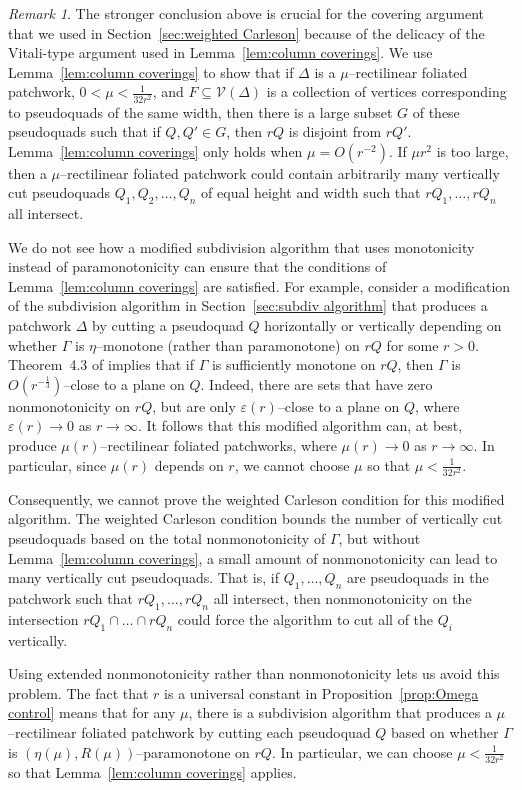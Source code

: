\documentclass[11pt,reqno]{amsart}
\newcommand{\cV}{\mathcal{V}}
\renewcommand{\epsilon}{\varepsilon}
\newcommand{\0}{\mathbf{0}}
\renewcommand{\1}{\mathbf 1}
\renewcommand{\subset}{\subseteq}
\theoremstyle{remark}
\newtheorem{remark}[thm]{Remark}
\begin{document}
\begin{remark}\label{rem:stronger-conclusion}
  The stronger conclusion above is crucial for the covering argument that we used in Section~\ref{sec:weighted Carleson} because of the delicacy of the Vitali-type argument used in Lemma~\ref{lem:column coverings}. We use Lemma~\ref{lem:column coverings} to show that if $\Delta$ is a $\mu$--rectilinear foliated patchwork, $0<\mu<\frac{1}{32r^2}$, and $F\subset \cV(\Delta)$ is a collection of vertices corresponding to pseudoquads of the same width, then there is a large subset $G$ of these pseudoquads such that if $Q,Q'\in G$, then $r Q$ is disjoint from $r Q'$. Lemma~\ref{lem:column coverings} only holds when $\mu=O(r^{-2})$.  If $\mu r^2$ is too large, then a $\mu$--rectilinear foliated patchwork could contain arbitrarily many vertically cut pseudoquads $Q_1,Q_2,\dots,Q_n$ of equal height and width such that $rQ_1,\dots, rQ_n$ all intersect.

  We do not see how a modified subdivision algorithm that uses monotonicity instead of paramonotonicity can ensure that the conditions of Lemma~\ref{lem:column coverings} are satisfied. For example, consider a modification of the subdivision algorithm in Section~\ref{sec:subdiv algorithm} that produces a patchwork $\Delta$ by cutting a pseudoquad $Q$ horizontally or vertically depending on whether $\Gamma$ is $\eta$--monotone (rather than paramonotone) on $rQ$ for some $r>0$. Theorem~4.3 of \cite{CKN} implies that if $\Gamma$ is sufficiently monotone on $rQ$, then $\Gamma$ is $O(r^{-\frac{1}{3}})$--close to a plane on $Q$. Indeed, there are sets that have zero nonmonotonicity on $rQ$, but are only $\epsilon(r)$--close to a plane on $Q$, where $\epsilon(r)\to 0$ as $r\to \infty$. It follows that this modified algorithm can, at best, produce $\mu(r)$--rectilinear foliated patchworks, where $\mu(r)\to 0$ as $r\to \infty$. In particular, since $\mu(r)$ depends on $r$, we cannot choose $\mu$ so that $\mu<\frac{1}{32r^2}$.

  Consequently, we cannot prove the weighted Carleson condition for this modified algorithm. The weighted Carleson condition bounds the number of vertically cut pseudoquads based on the total nonmonotonicity of $\Gamma$, but without Lemma~\ref{lem:column coverings}, a small amount of nonmonotonicity can lead to many vertically cut pseudoquads. That is, if $Q_1,\dots, Q_n$ are pseudoquads in the patchwork such that $rQ_1,\dots, rQ_n$ all intersect, then nonmonotonicity on the intersection $rQ_1\cap \dots\cap rQ_n$ could force the algorithm to cut all of the $Q_i$ vertically.

  Using extended nonmonotonicity rather than nonmonotonicity lets us avoid this problem. The fact that $r$ is a universal constant in Proposition~\ref{prop:Omega control} means that for any $\mu$, there is a subdivision algorithm that produces a $\mu$--rectilinear foliated patchwork by cutting each pseudoquad $Q$ based on whether $\Gamma$ is $(\eta(\mu),R(\mu))$--paramonotone on $rQ$. In particular, we can choose $\mu<\frac{1}{32r^2}$ so that Lemma~\ref{lem:column coverings} applies.
\end{remark}
\end{document}
